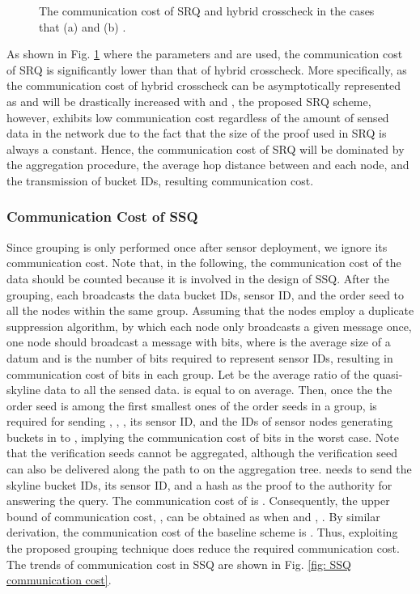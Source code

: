 \documentclass[conference]{IEEEtran}
\begin{document}
\begin{figure}[h]
\centering
{}
\caption{\scriptsize The communication cost of SRQ and hybrid crosscheck in the cases that (a)  and (b) .} \label{fig: communication cost}
\end{figure}

As shown in Fig. \ref{fig: communication cost} where the parameters  and  are used, the communication cost of SRQ is significantly lower than that of hybrid crosscheck. More specifically, as the communication cost of hybrid crosscheck can be asymptotically represented as  and will be drastically increased with  and , the proposed SRQ scheme, however, exhibits low communication cost regardless of the amount of sensed data in the network due to the fact that the size of the proof used in SRQ is always a constant. Hence, the communication cost of SRQ will be dominated by the aggregation procedure, the average hop distance between  and each node, and the transmission of bucket IDs, resulting  communication cost.

\subsubsection{Communication Cost of SSQ}
Since grouping is only performed once after sensor deployment, we ignore its communication cost. Note that, in the following, the communication cost of the data should be counted because it is involved in the design of SSQ. After the grouping, each  broadcasts the data bucket IDs, sensor ID, and the order seed to all the nodes within the same group. Assuming that the nodes employ a duplicate suppression algorithm, by which each node only broadcasts a given message once, one node should broadcast a message with  bits, where  is the average size of a datum and  is the number of bits required to represent sensor IDs, resulting in communication cost of  bits in each group. Let  be the average ratio of the quasi-skyline data to all the sensed data.  is equal to  on average. Then, once the the order seed is among the first  smallest ones of the order seeds in a group,  is required for sending , , , its sensor ID, and the IDs of sensor nodes generating buckets in  to , implying the communication cost of  bits in the worst case. Note that the verification seeds cannot be aggregated, although the verification seed can also be delivered along the path to  on the aggregation tree.  needs to send the skyline bucket IDs, its sensor ID, and a hash  as the proof to the authority for answering the query. The communication cost of  is . Consequently, the upper bound of communication cost, , can be obtained as  when  and , . By similar derivation, the communication cost of the baseline scheme is . Thus, exploiting the proposed grouping technique does reduce the required communication cost. The trends of communication cost in SSQ are shown in Fig. \ref{fig: SSQ communication cost}.
\end{document}
